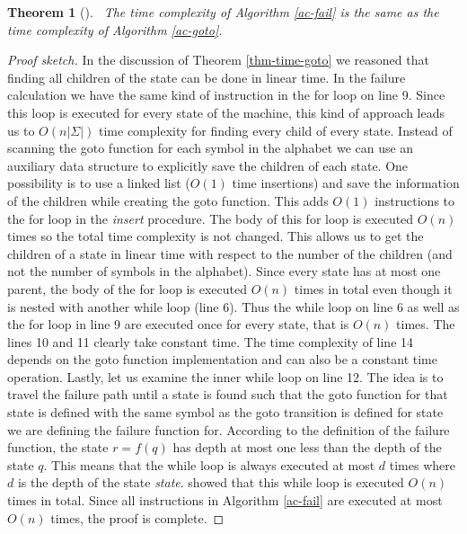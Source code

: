 \documentclass[english,twoside,censored,csm,algorithms-track-2020]{HYthesisML}
\theoremstyle{plain}
\newtheorem{theorem}{Theorem}[chapter]
\theoremstyle{definition}
\numberwithin{testexample}{chapter}
\begin{document}
\begin{theorem}[]~\label{thm-time-failure}
    The time complexity of Algorithm \ref{ac-fail} is the same as the time complexity of
  Algorithm \ref{ac-goto}.
\end{theorem}
\begin{proof}[Proof sketch]
In the discussion of Theorem
\ref{thm-time-goto} we reasoned that finding all children of the state can be done in
linear time. In the failure calculation we have the same kind of instruction in the for loop
on line 9. Since this loop is executed for every state of the machine, this kind of approach leads
us to $O(n|\Sigma|)$ time complexity for finding every child of every state. Instead of scanning
the goto function for each symbol in the alphabet we can use an auxiliary data structure to
explicitly save the children of each state. One possibility is to use a linked list ($O(1)$ time
insertions) and save the information of the children while creating the goto function. This adds
$O(1)$ instructions to the for loop in the \textit{insert} procedure. The body of this for loop
is executed $O(n)$ times so the total time complexity is not changed. This allows us to get the
children of a state in linear time with respect to the number of the children (and not the number of
symbols in the alphabet). Since every state
has at most one parent, the body of the for loop is executed $O(n)$ times in total even though it
is nested with another while loop (line 6). Thus the while loop on line 6 as well as the for loop in
line 9 are executed once for every state, that is $O(n)$ times. The lines 10 and 11 clearly take constant
time. The time complexity of line 14 depends on the goto function implementation and
can also be a constant time operation. Lastly, let us examine the inner while loop on line 12.
The idea is to travel the failure path until a state is found such that the goto function
for that state is defined with the same symbol as the goto transition is defined for state we are
defining the failure function for. According to the definition of the failure function, the state
$r=f(q)$ has depth at most one less than the depth of the state $q$. This means that the while
loop is always executed at most $d$ times where $d$ is the depth of the state \textit{state}.
\citep{Aho75} showed that this while loop is executed $O(n)$ times in total. Since all instructions
in Algorithm \ref{ac-fail} are executed at most $O(n)$ times, the proof is complete.
\end{proof}

\end{document}
